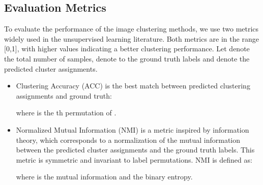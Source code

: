 \documentclass[11pt]{article}
\theoremstyle{definition}
\begin{document}
      

\subsection{Evaluation Metrics}

To evaluate the performance of the image clustering methods, we use two metrics widely used in the unsupervised learning literature. Both metrics are in the range [0,1], with higher values indicating a better clustering performance. Let  denote the total number of samples,  denote to the ground truth labels and  denote the predicted cluster assignments.

\begin{itemize}
	\item Clustering Accuracy (ACC) is the best match between predicted clustering assignments and ground truth:
	
	\vspace{-0.3cm}
	
	
	where  is the th permutation of .
	
	\item Normalized Mutual Information \cite{Vinh_InformationTheoreticMeasuresClusteringEvaluation_2010} (NMI) is a metric inspired by information theory, which corresponds to a normalization of the mutual information between the predicted cluster assignments and the ground truth labels. This metric is symmetric and invariant to label permutations. NMI is defined as:
	
	\vspace{-0.4cm}
	
	
	where  is the mutual information and  the binary entropy.
	
\end{itemize}
\end{document}
